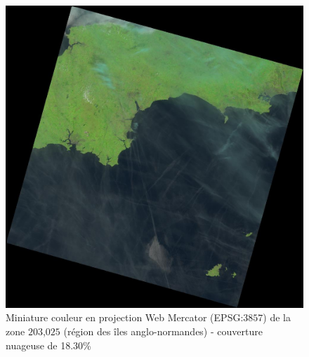 \documentclass{book}
\begin{document}
\begin{figure}[H]
\begin{center}
\includegraphics[scale=0.18]{images/LC82030252013196LGN00.jpg}
\end{center}
\caption{Miniature couleur en projection Web Mercator (EPSG:$3857$) de la zone $203$,$025$ (région des îles anglo-normandes) - couverture nuageuse de 18.30\%}
\label{cloud3}
\end{figure}
\end{document}
